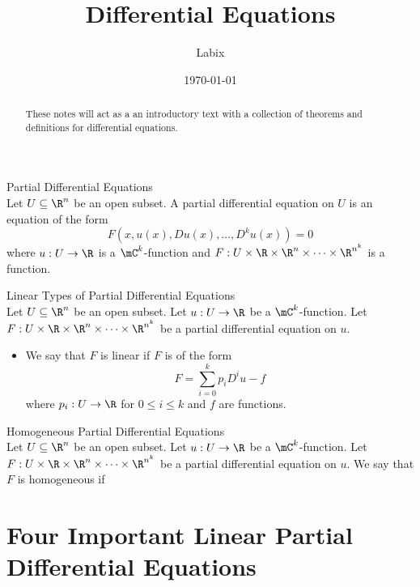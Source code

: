 \documentclass[a4paper]{article}
\title{Differential Equations}
\author{Labix}
\date{\today}
\begin{document}
\maketitle
\begin{abstract}
These notes will act as a an introductory text with a collection of theorems and definitions for differential equations. 
\end{abstract}
\tableofcontents
\pagebreak

\pagebreak
\section{}
\subsection{}
\begin{defn}{Partial Differential Equations}{}\\
Let $U\subseteq\R^n$ be an open subset. A partial differential equation on $U$ is an equation of the form $$F(x,u(x),Du(x),\dots,D^ku(x))=0$$ where $u:U\to\R$ is a $\mC^k$-function and $F:U\times\R\times\R^n\times\cdots\times\R^{n^k}$ is a function. 
\end{defn}

\begin{defn}{Linear Types of Partial Differential Equations}{}\\
Let $U\subseteq\R^n$ be an open subset. Let $u:U\to\R$ be a $\mC^k$-function. Let $F:U\times\R\times\R^n\times\cdots\times\R^{n^k}$ be a partial differential equation on $u$. 
\begin{itemize}
\item We say that $F$ is linear if $F$ is of the form $$F=\sum_{i=0}^kp_iD^iu-f$$ where $p_i:U\to\R$ for $0\leq i\leq k$ and $f$ are functions. 
\end{itemize}
\end{defn}

\begin{defn}{Homogeneous Partial Differential Equations}{}\\
Let $U\subseteq\R^n$ be an open subset. Let $u:U\to\R$ be a $\mC^k$-function. Let $F:U\times\R\times\R^n\times\cdots\times\R^{n^k}$ be a partial differential equation on $u$. We say that $F$ is homogeneous if 
\end{defn}

\pagebreak
\section{Four Important Linear Partial Differential Equations}
\end{document}
